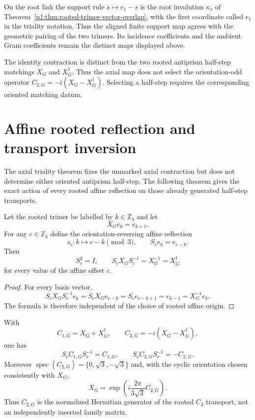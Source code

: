 \documentclass[11pt]{article}
\begin{document}
On the root link the support rule \(s\mapsto e_1-s\)
is the root involution \(\kappa_v\) of
Theorem~\ref{p1:thm:rooted-trimer-vector-overlap}, with the
first coordinate called \(e_1\) in the triality notation.
Thus the aligned finite support map agrees with the geometric
pairing of the two trimers. Its incidence coefficients and the
ambient Gram coefficients remain the distinct maps displayed above.

\begin{remark}
\label{p1:rem:v562-half-step-firewall}
The identity contraction is distinct from the two rooted antiprism
half-step matchings \(X_G\) and \(X_G^\dagger\).  Thus the axial map
does not select the orientation-odd operator
\(C_{2,G}=-i(X_G-X_G^\dagger)\).  Selecting a half-step requires the
corresponding oriented matching datum.
\end{remark}


\section{Affine rooted reflection and transport inversion}
\label{p1:sec:v563-affine-reflection-inversion}

The axial triality theorem fixes the unmarked axial contraction but does
not determine either oriented antiprism half-step.  The following theorem gives
the exact action of every rooted affine reflection on those already generated
half-step transports.

\begin{theorem}
\label{p1:thm:v563-affine-reflection-inversion}
Let the rooted trimer be labelled by $k\in\mathbb Z_3$ and let
\[
 X_G e_k=e_{k+1}.
\]
For any $c\in\mathbb Z_3$ define the orientation-reversing affine reflection
\[
 s_c:k\longmapsto c-k\pmod 3,
 \qquad S_c e_k=e_{c-k}.
\]
Then
\[
 S_c^2=I,
 \qquad
 \boxed{S_cX_GS_c^{-1}=X_G^{-1}=X_G^\dagger}
\]
for every value of the affine offset $c$.
\end{theorem}

\begin{proof}
For every basis vector,
\[
 S_cX_GS_c^{-1}e_k
 =S_cX_Ge_{c-k}
 =S_ce_{c-k+1}
 =e_{k-1}
 =X_G^{-1}e_k.
\]
The formula is therefore independent of the choice of rooted affine origin.
\end{proof}

\begin{corollary}
\label{p1:cor:v563-signline-parity-generator}
With
\[
 C_{1,G}=X_G+X_G^\dagger,
 \qquad
 C_{2,G}=-i(X_G-X_G^\dagger),
\]
one has
\[
 S_cC_{1,G}S_c^{-1}=C_{1,G},
 \qquad
 \boxed{S_cC_{2,G}S_c^{-1}=-C_{2,G}}.
\]
Moreover $\operatorname{spec}(C_{2,G})=\{0,\sqrt3,-\sqrt3\}$ and, with the
cyclic orientation chosen consistently with $X_G$,
\[
 \boxed{
 X_G=\exp\!\left(i\frac{2\pi}{3\sqrt3}C_{2,G}\right).}
\]
Thus $C_{2,G}$ is the normalized Hermitian generator of the rooted $C_3$
transport, not an independently inserted family matrix.
\end{corollary}
\end{document}
